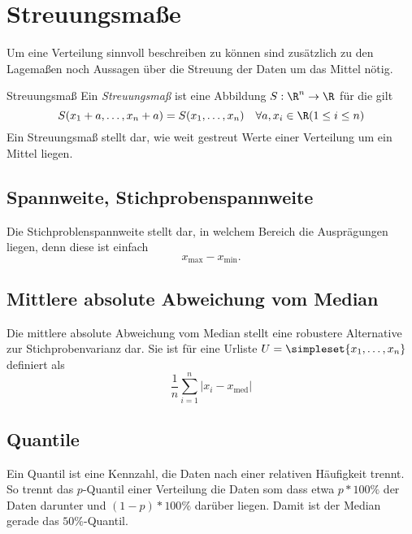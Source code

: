 \section{Streuungsmaße}
Um eine Verteilung sinnvoll beschreiben zu können sind zusätzlich zu den Lagemaßen noch Aussagen über die Streuung der Daten um das Mittel nötig.

\begin{definition}{Streuungsmaß}
	Ein \emph{Streuungsmaß} ist eine Abbildung $S:\R^n\rightarrow \R$ für die gilt
	\begin{equation*}
		S(x_1+a,\ldots,x_n+a)=S(x_1,\ldots,x_n) \quad\forall a,x_i\in\R (1\leq i\leq n)
	\end{equation*}
	Ein Streuungsmaß stellt dar, wie weit gestreut Werte einer Verteilung um ein Mittel liegen.
\end{definition}

\subsection{Spannweite, Stichprobenspannweite}
Die Stichproblenspannweite stellt dar, in welchem Bereich die Ausprägungen liegen, denn diese ist einfach
\begin{equation*}
	x_{\operatorname{max}}-x_{\operatorname{min}}.
\end{equation*}


\subsection{Mittlere absolute Abweichung vom Median}
Die mittlere absolute Abweichung vom Median stellt eine robustere Alternative zur Stichprobenvarianz dar. Sie ist für eine Urliste $U=\simpleset{x_1,\ldots,x_n}$ definiert als 
\begin{equation*}
	\frac 1n\sum_{i=1}^n|x_i-x_{\operatorname{med}}|
\end{equation*}


\subsection{Quantile}
Ein Quantil ist eine Kennzahl, die Daten nach einer relativen Häufigkeit trennt. So trennt das $p$-Quantil einer Verteilung die Daten som dass etwa $p*100\%$ der Daten darunter und $(1-p)*100\%$ darüber liegen. Damit ist der Median gerade das $50\%$-Quantil.

